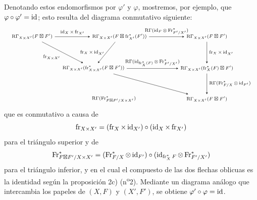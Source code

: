Denotando estos endomorfismos por $\varphi'$ y $\varphi$, mostremos, por ejemplo, que $\varphi\circ\varphi'=\operatorname{id}$; esto resulta del diagrama conmutativo siguiente:
\[
\resizebox{\textwidth}{!}{%
\begin{tikzpicture}[baseline=(current bounding box.center),>=stealth,font=\scriptsize]
\node (A) at (0,3.6) {$\RGamma_{X\times X'}(F\boxt F')$};
\node (B) at (4.7,3.6) {$\RGamma_{X\times X'}(F\boxt\fr_{X'}^*(F'))$};
\node (C) at (9.4,3.6) {$\RGamma_{X\times X'}(F\boxt F')$};
\node (D) at (3.3,1.9) {$\RGamma_{X\times X'}(\fr^*_{X\times X'}(F\boxt F'))$};
\node (E) at (9.4,1.9) {$\RGamma_{X\times X'}(\fr_X^*(F)\boxt F')$};
\node (F) at (4.4,0.25) {$\RGamma(\Fr^*_{F\boxt F'/X\times X'})$};
\node (G) at (9.4,0.25) {$\RGamma_{X\times X'}(F\boxt F')$};
\draw[->] (A) -- node[above] {$\id_X\times\fr_{X'}$} (B);
\draw[->] (B) -- node[above] {$\RGamma(\id_F\otimes\Fr^*_{F'/X'})$} (C);
\draw[->] (A) -- node[below left] {$\fr_{X\times X'}$} (D);
\draw[->] (B) -- node[left] {$\fr_X\times\id_{X'}$} (D);
\draw[->] (C) -- node[right] {$\fr_X\times\id_{X'}$} (E);
\draw[->] (D) -- node[above] {$\RGamma(\id_{\fr_X^*(F)}\otimes\Fr^*_{F'/X'})$} (E);
\draw[->] (E) -- node[right] {$\RGamma(\Fr^*_{F/X}\otimes\id_{F'})$} (G);
\draw[->] (D) -- (G);
\end{tikzpicture}%
}
\]
que es conmutativo a causa de
\[
\operatorname{fr}_{X\times X'}=(\operatorname{fr}_X\times\operatorname{id}_{X'})\circ(\operatorname{id}_X\times\operatorname{fr}_{X'})
\]
para el triángulo superior y de
\[
\operatorname{Fr}^*_{F\boxtimes F'/X\times X'}=(\operatorname{Fr}^*_{F/X}\otimes\operatorname{id}_{F'})\circ(\operatorname{id}_{\operatorname{fr}_X^*F}\otimes\operatorname{Fr}^*_{F'/X'})
\]
para el triángulo inferior, y en el cual el compuesto de las dos flechas oblicuas es la identidad según la proposición 2c) (n\textsuperscript{o}2). Mediante un diagrama análogo que intercambia los papeles de $(X,F)$ y $(X',F')$, se obtiene $\varphi'\circ\varphi=\operatorname{id}$.
